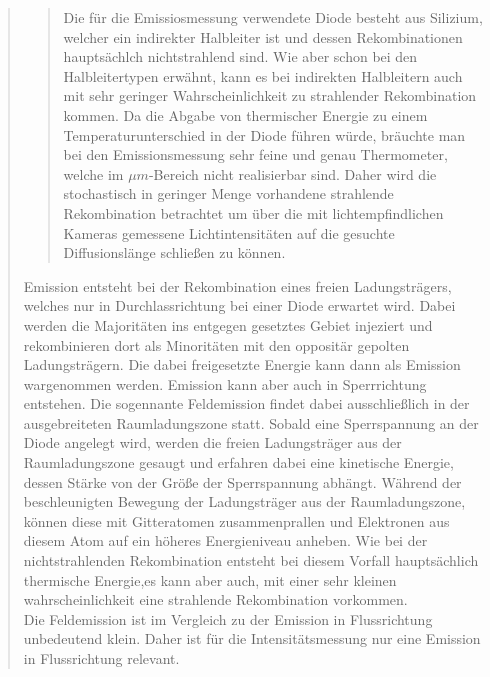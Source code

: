 \begin{quote}
\begin{quote}
        Die für die Emissiosmessung verwendete Diode besteht aus Silizium,
        welcher ein indirekter Halbleiter ist und dessen Rekombinationen
        hauptsächlch nichtstrahlend sind. Wie aber schon bei den Halbleitertypen
        erwähnt, kann es bei indirekten Halbleitern auch mit sehr geringer
        Wahrscheinlichkeit zu strahlender Rekombination kommen. Da die Abgabe
        von thermischer Energie zu einem Temperaturunterschied in der Diode
        führen würde, bräuchte man bei den Emissionsmessung sehr feine und genau
        Thermometer, welche im $\mu m$-Bereich nicht realisierbar sind. Daher
        wird die stochastisch in geringer Menge vorhandene strahlende
        Rekombination betrachtet um über die mit lichtempfindlichen
        Kameras gemessene Lichtintensitäten auf die gesuchte Diffusionslänge
        schließen zu können.

        \end{quote}

        \vspace{1.5em}

        Emission entsteht bei der Rekombination eines freien Ladungsträgers,
        welches nur in Durchlassrichtung bei einer Diode erwartet wird. Dabei
        werden die Majoritäten ins entgegen gesetztes Gebiet injeziert und
        rekombinieren dort als Minoritäten mit den oppositär gepolten
        Ladungsträgern. Die dabei freigesetzte Energie kann dann als Emission
        wargenommen werden. Emission kann aber auch in Sperrrichtung entstehen.
        Die sogennante Feldemission findet dabei ausschließlich in der
        ausgebreiteten Raumladungszone statt. Sobald eine Sperrspannung an der
        Diode angelegt wird, werden die freien Ladungsträger aus der
        Raumladungszone gesaugt und erfahren dabei eine kinetische Energie,
        dessen Stärke von der Größe der Sperrspannung abhängt. Während der
        beschleunigten Bewegung der Ladungsträger aus der Raumladungszone,
        können diese mit Gitteratomen zusammenprallen und Elektronen aus diesem
        Atom auf ein höheres Energieniveau anheben. Wie bei der nichtstrahlenden
        Rekombination entsteht bei diesem Vorfall hauptsächlich thermische
        Energie,es kann aber auch, mit einer sehr kleinen wahrscheinlichkeit
        eine strahlende Rekombination vorkommen.\\
        Die Feldemission ist im Vergleich zu der Emission in Flussrichtung
        unbedeutend klein. Daher ist für die Intensitätsmessung nur eine
        Emission in Flussrichtung relevant.


\end{quote}
